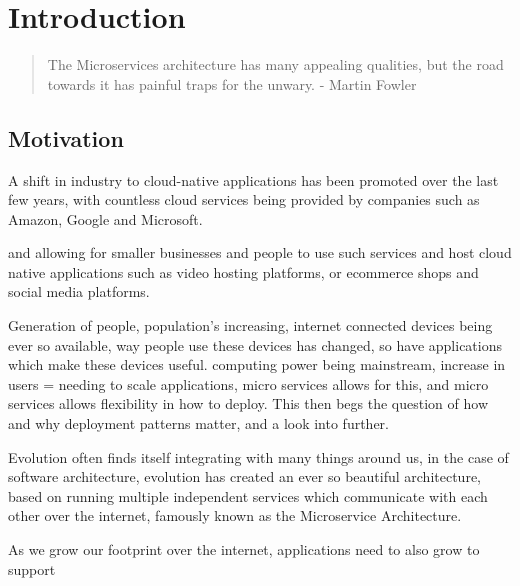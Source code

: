 \chapter{Introduction}
\begin{quote}
     The Microservices architecture has many appealing qualities, but the road towards it has painful traps for the unwary. - Martin Fowler
\end{quote}
\section{Motivation}
A shift in industry to cloud-native applications has been promoted over the last few years, with countless cloud services being provided by companies such as Amazon, Google and Microsoft. 


and allowing for smaller businesses and people to use such services and host cloud native applications such as video hosting platforms, or ecommerce shops and social media platforms. 


Generation of people, population's increasing, internet connected devices being ever so available, way people use these devices has changed, so have applications which make these devices useful. computing power being mainstream, increase in users = needing to scale applications, micro services allows for this, and micro services allows flexibility in how to deploy. This then begs the question of  how and why deployment patterns matter, and a look into further.

Evolution often finds itself integrating with many things around us, in the case of software architecture, evolution has created an ever so beautiful architecture, based on running multiple independent services which communicate with each other over the internet, famously known as the Microservice Architecture. 

As we grow our footprint over the internet, applications need to also grow to support 








